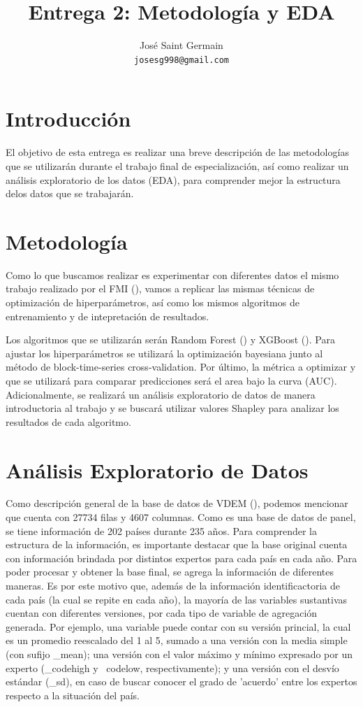 \documentclass{article}
\title{Entrega 2: Metodología y EDA}
\author{%
  José Saint Germain\\
  \texttt{josesg998@gmail.com} \\
}
\begin{document}
\maketitle

\section{Introducción}
El objetivo de esta entrega es realizar una breve descripción de las metodologías 
que se utilizarán durante el trabajo final de especialización, así como realizar 
un análisis exploratorio de los datos (EDA), para comprender mejor la estructura 
delos datos que se trabajarán.

\section{Metodología}
Como lo que buscamos realizar es experimentar con diferentes datos el mismo 
trabajo realizado por el FMI (\cite{Ceb24}), vamos a replicar las mismas 
técnicas de optimización de hiperparámetros, así como los mismos algoritmos
 de entrenamiento y de intepretación de resultados.

Los algoritmos que se utilizarán serán Random Forest (\cite{Bre01}) y XGBoost
(\cite{Che16}). Para ajustar los hiperparámetros se utilizará la optimización
bayesiana junto al método de block-time-series cross-validation. Por último, 
la métrica a optimizar y que se utilizará para comparar predicciones será el
area bajo la curva (AUC). Adicionalmente, se realizará un análisis exploratorio
de datos de manera introductoria al trabajo y se buscará utilizar valores Shapley 
para analizar los resultados de cada algoritmo.


\section{Análisis Exploratorio de Datos}

Como descripción general de la base de datos de VDEM (\cite{Cop24}), podemos mencionar que cuenta 
con 27734 filas y 4607 columnas. Como es una base de datos de panel, se tiene
información de 202 países durante 235 años. Para comprender la estructura de 
la información, es importante destacar que la base original cuenta con información 
brindada por distintos expertos para cada país en cada año. Para poder procesar y 
obtener la base final, se agrega la información de diferentes maneras. Es por este 
motivo que, además de la información identificactoria de cada país (la cual se 
repite en cada año), la mayoría de las variables sustantivas cuentan con diferentes 
versiones, por cada tipo de variable de agregación generada. Por ejemplo, una 
variable puede contar con su versión princial, la cual es un promedio reescalado 
del 1 al 5, sumado a una versión con la media simple (con sufijo \_mean); una 
versión con el valor máximo y mínimo expresado por un experto (\_codehigh y 
\ codelow, respectivamente); y una versión con el desvío estándar (\_sd), en 
caso de buscar conocer el grado de 'acuerdo' entre los expertos respecto a
la situación del país.
\end{document}
